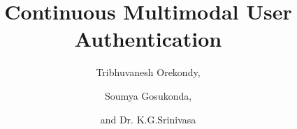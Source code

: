 \documentclass[%
        submission,
        notitlepage,
        narroweqnarray,
        inline,
        ]{ieee}
\begin{document}
\title[Continuous Multimodal User Authentication, using soft and hard biometrics]{%
       Continuous Multimodal User Authentication}


\author[]{%
      Tribhuvanesh Orekondy,
    \and
      Soumya Gosukonda,
    \and
      and Dr. K.G.Srinivasa
  }




\maketitle               
\end{document}
